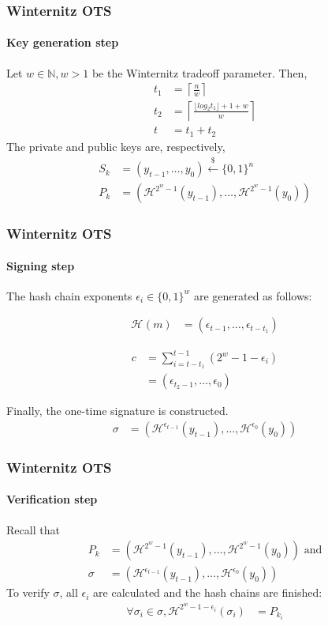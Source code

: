 \documentclass[12pt]{beamer}
\newcommand{\hash}[2][]{\mathcal{H}^{#1}(#2)}
\begin{document}
\begin{frame}
  \frametitle{Winternitz OTS}
  \framesubtitle{Key generation step}
  Let $w \in \mathbb{N}, w > 1$ be the Winternitz tradeoff
  parameter. Then,
   \begin{align*}
       t_1 &= \left\lceil \frac{n}{w} \right\rceil \\
       t_2 &= \left\lceil
       \frac{\lfloor log_2 t_1 \rfloor + 1 + w}{w} \right\rceil \\
         t &= t_1 + t_2
   \end{align*}
   The private and public keys are, respectively,
   \begin{align*}
     S_k &= (y_{t - 1}, \dots, y_{0})
       \stackrel{\$}{\longleftarrow} \{0,1\}^n \\
     P_k &= (\hash[2^w - 1]{y_{t - 1}}, \dots, \hash[2^w - 1]{y_0})
   \end{align*}
\end{frame}

\begin{frame}
  \frametitle{Winternitz OTS}
  \framesubtitle{Signing step}
  The hash chain exponents $\epsilon_i \in \{0, 1\}^w$
  are generated as follows:
  \begin{minipage}{.45\linewidth}
  \begin{align*}
    \hash{m} &= (\epsilon_{t - 1}, \dots, \epsilon_{t - t_1})
  \end{align*}
  \end{minipage}
  \begin{minipage}{.45\linewidth}
  \begin{align*}
    c &= \sum_{i = t - t_1}^{t - 1} (2^w - 1 - \epsilon_i) \\
      &= (\epsilon_{t_2 - 1}, \dots, \epsilon_{0})
  \end{align*}
  \end{minipage}
  \vspace{4mm}
  
  Finally, the one-time signature is constructed.
  \begin{align*}
    \sigma &= (\mathcal{H}^{\epsilon_{t - 1}}(y_{t - 1}),
    \dots, \mathcal{H}^{\epsilon_0}(y_0))
  \end{align*}
\end{frame}

\begin{frame}
  \frametitle{Winternitz OTS}
  \framesubtitle{Verification step}
  Recall that
  \begin{align*}
    P_k &= (\hash[2^w - 1]{y_{t - 1}}, \dots, \hash[2^w - 1]{y_0}) \text{ and} \\
    \sigma &= (\mathcal{H}^{\epsilon_{t - 1}}(y_{t - 1}), \dots, \mathcal{H}^{\epsilon_0}(y_0))
  \end{align*}
  To verify $\sigma$, all $\epsilon_i$ are calculated and the hash chains are finished:
  \begin{align*}
    \forall \sigma_i \in \sigma,
        \hash[2^w - 1 - \epsilon_{i}]{\sigma_i} &= P_{k_i}
  \end{align*}
\end{frame}
\end{document}
